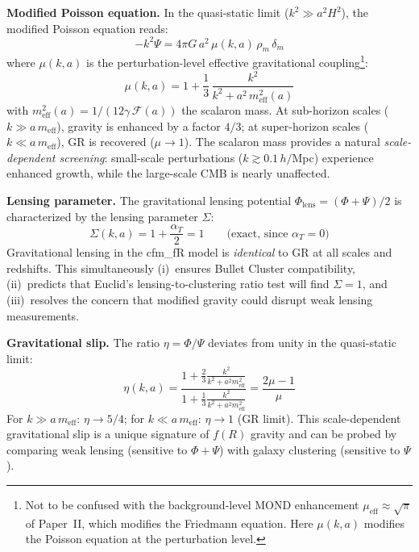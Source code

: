 \documentclass[aps,prd,twocolumn,superscriptaddress,nofootinbib]{revtex4-2}
\begin{document}
\textbf{Modified Poisson equation.} In the quasi-static limit ($k^2 \gg a^2 H^2$), the modified Poisson equation reads:
\begin{equation}
-k^2 \Psi = 4\pi G\,a^2\,\mu(k,a)\,\rho_m\,\delta_m
\label{eq:modified_poisson}
\end{equation}
where $\mu(k,a)$ is the perturbation-level effective gravitational coupling\footnote{Not to be confused with the background-level MOND enhancement $\mu_{\mathrm{eff}} \approx \sqrt{\pi}$ of Paper~II, which modifies the Friedmann equation. Here $\mu(k,a)$ modifies the Poisson equation at the perturbation level.}:
\begin{equation}
{\mu(k,a) = 1 + \frac{1}{3}\,\frac{k^2}{k^2 + a^2\,m_{\mathrm{eff}}^2(a)}}
\label{eq:mu_ka}
\end{equation}
with $m_{\mathrm{eff}}^2(a) = 1/(12\gamma\,\mathcal{F}(a))$ the scalaron mass. At sub-horizon scales ($k \gg a\,m_{\mathrm{eff}}$), gravity is enhanced by a factor $4/3$; at super-horizon scales ($k \ll a\,m_{\mathrm{eff}}$), GR is recovered ($\mu \to 1$). The scalaron mass provides a natural \textit{scale-dependent screening}: small-scale perturbations ($k \gtrsim 0.1\,h/$Mpc) experience enhanced growth, while the large-scale CMB is nearly unaffected.

\textbf{Lensing parameter.} The gravitational lensing potential $\Phi_{\mathrm{lens}} = (\Phi + \Psi)/2$ is characterized by the lensing parameter $\Sigma$:
\begin{equation}
{\Sigma(k,a) = 1 + \frac{\alpha_T}{2} = 1 \qquad \text{(exact, since $\alpha_T = 0$)}}
\label{eq:sigma_lensing}
\end{equation}
Gravitational lensing in the cfm\_fR model is \textit{identical} to GR at all scales and redshifts. This simultaneously (i)~ensures Bullet Cluster compatibility, (ii)~predicts that Euclid's lensing-to-clustering ratio test will find $\Sigma = 1$, and (iii)~resolves the concern that modified gravity could disrupt weak lensing measurements.

\textbf{Gravitational slip.} The ratio $\eta = \Phi/\Psi$ deviates from unity in the quasi-static limit:
\begin{equation}
\eta(k,a) = \frac{1 + \frac{2}{3}\frac{k^2}{k^2 + a^2 m_{\mathrm{eff}}^2}}{1 + \frac{1}{3}\frac{k^2}{k^2 + a^2 m_{\mathrm{eff}}^2}} = \frac{2\mu - 1}{\mu}
\end{equation}
For $k \gg a\,m_{\mathrm{eff}}$: $\eta \to 5/4$; for $k \ll a\,m_{\mathrm{eff}}$: $\eta \to 1$ (GR limit). This scale-dependent gravitational slip is a unique signature of $f(R)$ gravity and can be probed by comparing weak lensing (sensitive to $\Phi + \Psi$) with galaxy clustering (sensitive to $\Psi$).
\end{document}
